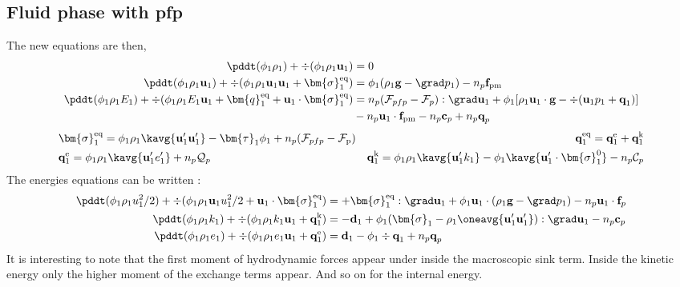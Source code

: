 \subsection*{Fluid phase with pfp}
The new equations are then, 
\begin{align}
    \pddt (\phi_1 \rho_1)  
    + \div (
        \phi_1 \rho_1\textbf{u}_1
    )
    &= 
    0\\
    \pddt (\phi_1 \rho_1\textbf{u}_1)  
    + \div (
        \phi_1 \rho_1\textbf{u}_1\textbf{u}_1
        + \bm{\sigma}_1^\text{eq}
    )
    &= 
    \phi_1 (\rho_1 \textbf{g} 
    - \grad p_1 ) 
    -  n_p \textbf{f}_\text{pm}\\
    \pddt (\phi_1\rho_1E_1)  
    + \div (
        \phi_1\rho_1E_1\textbf{u}_1
        + \bm{q}_1^\text{eq}
        + \textbf{u}_1 \cdot \bm{\sigma}_1^\text{eq}
        )
    &= 
    n_p (\mathcal{F}_{pfp}- \mathcal{F}_p) :\grad \textbf{u}_1
    +\phi_1 [\rho_1\textbf{u}_1 \cdot \textbf{g} 
    - \div(\textbf{u}_1p_1 + \textbf{q}_1)]\nonumber\\
    &- n_p \textbf{u}_1 \cdot \textbf{f}_\text{pm}
    - n_p \textbf{c}_p
    + n_p \textbf{q}_p
\end{align} 
\begin{align*}
    &\bm{\sigma}_1^\text{eq}
    = \phi_1\rho_1\kavg{\textbf{u}_1'\textbf{u}_1'}
    - \bm{\tau}_1 \phi_1
    + n_p (\mathcal{F}_{pfp} - \mathcal{F}_\text{p})
    &\textbf{q}_1^\text{eq}
    =\textbf{q}_1^\text{e} +\textbf{q}_1^\text{k} \\
    &\textbf{q}_1^\text{e}
    = \phi_1\rho_1 \kavg{\textbf{u}_1' e_1'} + n_p \mathcal{Q}_p
    &\textbf{q}_1^\text{k}
    = \phi_1\rho_1 \kavg{\textbf{u}_1' k_1} 
    - \phi_1\kavg{\textbf{u}_1' \cdot \bm{\sigma}_1^0}
    - n_p \mathcal{C}_p 
\end{align*}
The energies equations can be written : 
\begin{align}
    \pddt (\phi_1 \rho_1u_1^2/2)  
    + \div (
        \phi_1 \rho_1\textbf{u}_1u_1^2/2
        + \textbf{u}_1 \cdot \bm{\sigma}_1^\text{eq}
    )
    &= 
    + \bm{\sigma}_1^\text{eq} : \grad \textbf{u}_1
    + \phi_1  \textbf{u}_1\cdot(\rho_1 \textbf{g} - \grad p_1) 
    - n_p \textbf{u}_1\cdot \textbf{f}_p\\
    \pddt (\phi_1\rho_1k_1)  
    + \div (
        \phi_1\rho_1k_1\textbf{u}_1
        + \textbf{q}_1^\text{k} 
        )
    &= 
    - \textbf{d}_1
    + \phi_1(\bm{\sigma}_1 - \rho_1 \oneavg{\textbf{u}_1'\textbf{u}_1'} ): \grad \textbf{u}_1
    - n_p \textbf{c}_p\\
    \pddt (\phi_1\rho_1e_1)  
    + \div (
        \phi_1 \rho_1e_1\textbf{u}_1
        +
        \textbf{q}_1^\text{e} 
        )
    &= 
    \textbf{d}_1
    - \phi_1 \div \textbf{q}_1
    + n_p \textbf{q}_p
\end{align}
It is interesting to note that the first moment of hydrodynamic forces appear under inside the macroscopic sink term. 
Inside the kinetic energy only the higher moment of the exchange terms appear. 
And so on for the internal energy. 

